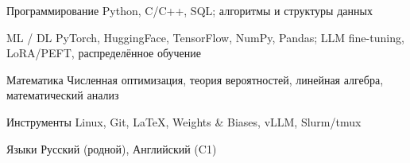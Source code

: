 
\begin{cvskills}

  \cvskill
    {Программирование} %
    {Python, C/C++, SQL; алгоритмы и структуры данных} %

  \cvskill
    {ML / DL} %
    {PyTorch, HuggingFace, TensorFlow, NumPy, Pandas; LLM fine-tuning, LoRA/PEFT, распределённое обучение} %

  \cvskill
    {Математика} %
    {Численная оптимизация, теория вероятностей, линейная алгебра, математический анализ} %

  \cvskill
    {Инструменты} %
    {Linux, Git, \LaTeX, Weights \& Biases, vLLM, Slurm/tmux} %

  \cvskill
    {Языки} %
    {Русский (родной), Английский (C1)} %

\end{cvskills}
